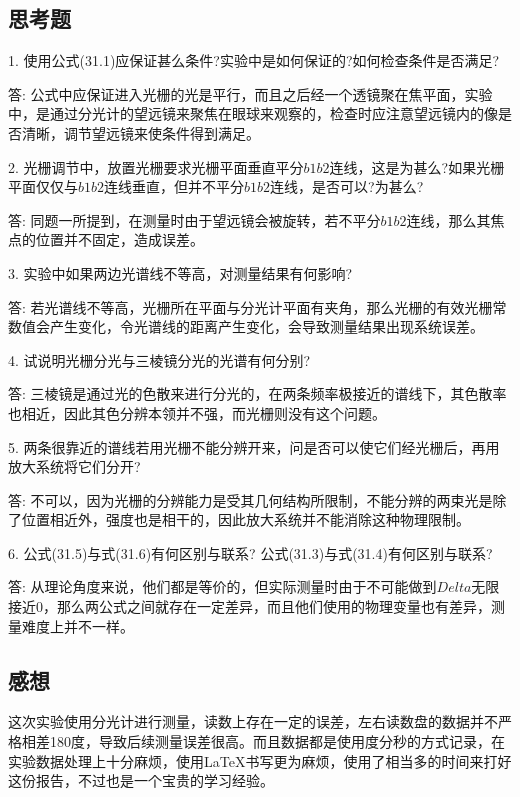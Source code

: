 \documentclass[a4paper]{article}
\begin{document}
\subsection{思考题}
\begin{spacing}{1.6}
	1. 使用公式(31.1)应保证甚么条件?实验中是如何保证的?如何检查条件是否满足?\par
	答: 公式中应保证进入光栅的光是平行，而且之后经一个透镜聚在焦平面，实验中，是通过分光计的望远镜来聚焦在眼球来观察的，检查时应注意望远镜内的像是否清晰，调节望远镜来使条件得到满足。\par
	2. 光栅调节中，放置光栅要求光栅平面垂直平分$b1b2$连线，这是为甚么?如果光栅平面仅仅与$b1b2$连线垂直，但并不平分$b1b2$连线，是否可以?为甚么?\par
	答: 同题一所提到，在测量时由于望远镜会被旋转，若不平分$b1b2$连线，那么其焦点的位置并不固定，造成误差。\par
	3. 实验中如果两边光谱线不等高，对测量结果有何影响?\par
	答: 若光谱线不等高，光栅所在平面与分光计平面有夹角，那么光栅的有效光栅常数值会产生变化，令光谱线的距离产生变化，会导致测量结果出现系统误差。\par
	4. 试说明光栅分光与三棱镜分光的光谱有何分别?\par
	答: 三棱镜是通过光的色散来进行分光的，在两条频率极接近的谱线下，其色散率也相近，因此其色分辨本领并不强，而光栅则没有这个问题。\par
	5. 两条很靠近的谱线若用光栅不能分辨开来，问是否可以使它们经光栅后，再用放大系统将它们分开?\par
	答: 不可以，因为光栅的分辨能力是受其几何结构所限制，不能分辨的两束光是除了位置相近外，强度也是相干的，因此放大系统并不能消除这种物理限制。\par
	6. 公式(31.5)与式(31.6)有何区别与联系? 公式(31.3)与式(31.4)有何区别与联系?\par
	答: 从理论角度来说，他们都是等价的，但实际测量时由于不可能做到$Delta$无限接近0，那么两公式之间就存在一定差异，而且他们使用的物理变量也有差异，测量难度上并不一样。\par    \end{spacing}

\subsection{感想}
\begin{spacing}{1.6}
	这次实验使用分光计进行测量，读数上存在一定的误差，左右读数盘的数据并不严格相差180度，导致后续测量误差很高。而且数据都是使用度分秒的方式记录，在实验数据处理上十分麻烦，使用LaTeX书写更为麻烦，使用了相当多的时间来打好这份报告，不过也是一个宝贵的学习经验。
\end{spacing}
\end{document}
